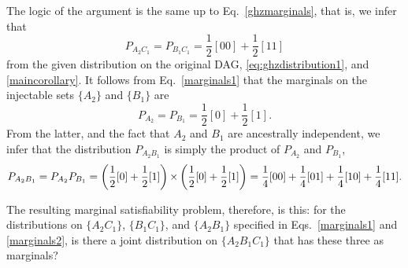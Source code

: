 {The logic of the argument is the same up to Eq.~\eqref{ghzmarginals}, that is, we infer that 
\begin{equation}
P_{A_2 C_1} = P_{B_1 C_1} = \frac{1}{2} [00] +\frac{1}{2} [11]\label{marginals1}
\end{equation}
from the given distribution on the original DAG, \cref{eq:ghzdistribution1}, and \cref{maincorollary}. 
It follows from Eq.~\eqref{marginals1} that the marginals on the injectable sets $\{ A_2\}$ and $\{ B_1\}$ are 
\begin{equation}
P_{A_2} = P_{B_1}=\frac{1}{2} [0] +\frac{1}{2} [1].
\end{equation}
From the latter, and the fact that $A_2$ and $B_1$ are ancestrally independent, we infer that the distribution $P_{A_2 B_1}$ is simply the product of $P_{A_2}$ and  $P_{B_1}$,
\begin{equation}
P_{A_2 B_1} = P_{A_2}P_{B_1} = \left(\frac{1}{2} [0] +\frac{1}{2} [1]\right)\mathord{\times}\left(\frac{1}{2} [0] +\frac{1}{2} [1]\right)=\frac{1}{4} [00]+\frac{1}{4} [01]+\frac{1}{4} [10]+\frac{1}{4} [11].
\label{marginals2}
\end{equation}



The resulting marginal satisfiability problem, therefore, is this: for the distributions on $\{A_2 C_1\}$, $\{B_1 C_1\}$, and $\{A_2 B_1\}$ specified in Eqs.~\eqref{marginals1} and \eqref{marginals2}, is there a joint distribution on  $\{ A_2 B_1 C_1\}$ that has these three as marginals?


}
